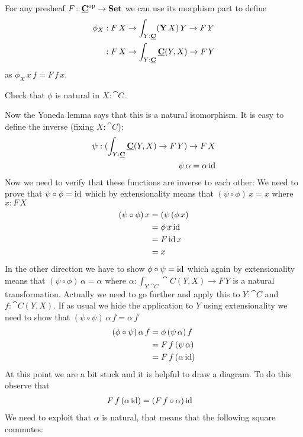 For any presheaf $F : \underline{\mathbf{C}}^{\mathrm{op}}\to\mathbf{Set}$ we can use its morphism part to define
\begin{align*}
  \phi_X & : F\,X \to \int_{Y : \underline{\mathbf{C}}} (\mathbf{Y}\,X)\,Y \to F\,Y \\
            & :  F\,X \to \int_{Y : \underline{\mathbf{C}}} \underline{\mathbf{C}}(Y,X) \to F\,Y \\
\end{align*}
as $\phi_X\,x\,f = F\,f\,x$. 
\begin{Exercise}
  Check that $\phi$ is natural in $X:\cat{C}$.
\end{Exercise}

Now the Yoneda lemma says that this is a natural isomorphism. It is easy to define the inverse (fixing $X:\cat{C}$):
\begin{align*}
  \psi : (\int_{Y : \underline{\mathbf{C}}} \underline{\mathbf{C}}(Y,X) \to F\,Y) \to F\,X\\
  \psi\,\alpha = \alpha\,\mathrm{id}
\end{align*}
Now we need to verify that these functions are inverse to each other: We need to prove that $\psi \circ \phi = \mathrm{id}$ which by extensionality means that $(\psi \circ \phi)\,x = x$ where $x : F\,X$
\begin{align*}
  (\psi \circ \phi)\,x 
  & = (\psi\,(\phi\,x) \\
  & = \phi\,x\,\mathrm{id} \\
  & = F\,\mathrm{id}\,x \\
  & = x
\end{align*}
In the other direction we have to show $\phi \circ \psi = \mathrm{id}$ which again by extensionality means that 
$(\psi \circ \phi)\,\alpha = \alpha$ where $\alpha : \int_{Y : \cat{C}} \cat{C}(Y,X) \to F\,Y$ is a natural transformation. Actually we need to go further and apply this to $Y : \cat{C}$ and $f : \cat{C}(Y,X)$. If as usual we hide the application to $Y$ using extensionality we need to show that $(\psi \circ \psi)\,\alpha\,f = \alpha\,f$
\begin{align*}
  (\phi \circ \psi)\,\alpha\,f
  & = \phi\,(\psi\,\alpha)\,f \\
  & = F\,f\,(\psi\,\alpha) \\
  & = F\,f\,(\alpha\,\mathrm{id}) 
\end{align*}
At this point we are a bit stuck and it is helpful to draw a diagram. To do this observe that 
\begin{align*}
 F\,f\,(\alpha\,\mathrm{id}) 
 & = (F\, f \circ \alpha)\,\mathrm{id}
\end{align*}
We need to exploit that $\alpha$ is natural, that means that the following square commutes:
